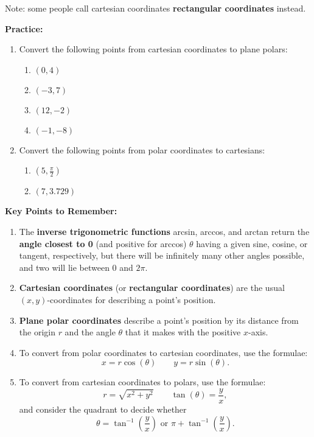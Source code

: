\documentclass{article}
\begin{document}
Note: some people call cartesian coordinates \textbf{rectangular coordinates} instead.

\clearpage



\textbf{Practice:}

\begin{enumerate}
\item Convert the following points from cartesian coordinates to plane polars:
	\begin{enumerate}
	\item $(0,4)$
	\item $(-3,7)$
	\item $(12,-2)$
	\item $(-1,-8)$
	\end{enumerate}
\item Convert the following points from polar coordinates to cartesians:
	\begin{enumerate}
	\item $\left(5,\frac{\pi}{2}\right)$
	\item $(7,3.729)$
	\end{enumerate}
\end{enumerate}





\clearpage


{\bf Key Points to Remember:}

\vspace{5mm}

\begin{enumerate}
\item The \textbf{inverse trigonometric functions} arcsin, arccos, and arctan return the \textbf{angle closest to 0} (and positive for arccos) $\theta$ having a given sine, cosine, or tangent, respectively, but there will be infinitely many other angles possible, and two will lie between 0 and $2\pi$.
\item \textbf{Cartesian coordinates} (or \textbf{rectangular coordinates}) are the usual $(x,y)$-coordinates for describing a point's position.
\item \textbf{Plane polar coordinates} describe a point's position by its distance from the origin $r$ and the angle $\theta$ that it makes with the positive $x$-axis.
\item To convert from polar coordinates to cartesian coordinates, use the formulae:
\[x=r\cos(\theta)\qquad y=r\sin(\theta).\]
\item To convert from cartesian coordinates to polars, use the formulae:
\[r=\sqrt{x^2+y^2}\qquad \tan(\theta)=\frac{y}{x},\]
and consider the quadrant to decide whether
\[\theta=\tan^{-1}\left(\frac{y}{x}\right)\mbox{ or } \pi+\tan^{-1}\left(\frac{y}{x}\right).\]
\end{enumerate}
\end{document}
